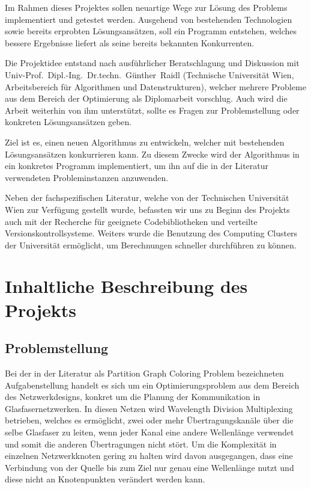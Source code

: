\documentclass[paper=a4,fontsize=12pt]{scrartcl}
\begin{document}
Im Rahmen dieses Projektes sollen neuartige Wege zur Lösung des Problems implementiert und getestet werden. Ausgehend von bestehenden Technologien sowie bereits erprobten Lösungsansätzen, soll ein Programm entstehen, welches bessere Ergebnisse liefert als seine bereits bekannten Konkurrenten.

Die Projektidee entstand nach ausführlicher Beratschlagung und Diskussion mit Univ-Prof.~Dipl.-Ing.~Dr.techn.~Günther~Raidl (Technische Universität Wien, Arbeitsbereich für Algorithmen und Datenstrukturen), welcher mehrere Probleme aus dem Bereich der Optimierung als Diplomarbeit vorschlug. Auch wird die Arbeit weiterhin von ihm unterstützt, sollte es Fragen zur Problemstellung oder konkreten Lösungsansätzen geben.

Ziel ist es, einen neuen Algorithmus zu entwickeln, welcher mit bestehenden Lösungs\-an\-sätz\-en konkurrieren kann. Zu diesem Zwecke wird der Algorithmus in ein konkretes Programm implementiert, um ihn auf die in der Literatur verwendeten Probleminstanzen anzuwenden.

Neben der fachspezifischen Literatur, welche von der Technischen Universität Wien zur Verfügung gestellt wurde, befassten wir uns zu Beginn des Projekts auch mit der Recherche für geeignete Codebibliotheken und verteilte Versionskontrollsysteme. Weiters wurde die Benutzung des Computing Clusters der Universität ermöglicht, um Berechnungen schneller durchführen zu können.
\section{Inhaltliche Beschreibung des Projekts}

\subsection{Problemstellung}
Bei der in der Literatur als Partition Graph Coloring Problem bezeichneten Aufgabenstellung handelt es sich um ein Optimierungsproblem aus dem Bereich des Netzwerkdesigns, konkret um die Planung der Kommunikation in Glasfasernetzwerken. In diesen Netzen wird Wavelength Division Multiplexing betrieben, welches es ermöglicht, zwei oder mehr Übertragungskanäle über die selbe Glasfaser zu leiten, wenn jeder Kanal eine andere Wellenlänge verwendet und somit die anderen Übertragungen nicht stört. Um die Komplexität in einzelnen Netzwerkknoten gering zu halten wird davon ausgegangen, dass eine Verbindung von der Quelle bis zum Ziel nur genau eine Wellenlänge nutzt und diese nicht an Knotenpunkten verändert werden kann.
\end{document}
